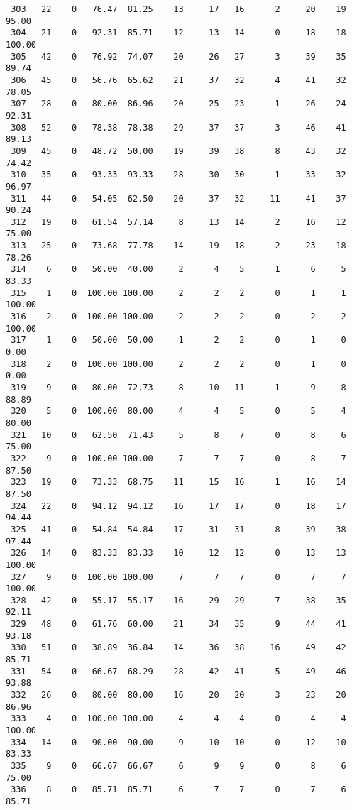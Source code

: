 \begin{verbatim}
 303   22    0   76.47  81.25    13     17   16      2     20    19    95.00
 304   21    0   92.31  85.71    12     13   14      0     18    18   100.00
 305   42    0   76.92  74.07    20     26   27      3     39    35    89.74
 306   45    0   56.76  65.62    21     37   32      4     41    32    78.05
 307   28    0   80.00  86.96    20     25   23      1     26    24    92.31
 308   52    0   78.38  78.38    29     37   37      3     46    41    89.13
 309   45    0   48.72  50.00    19     39   38      8     43    32    74.42
 310   35    0   93.33  93.33    28     30   30      1     33    32    96.97
 311   44    0   54.05  62.50    20     37   32     11     41    37    90.24
 312   19    0   61.54  57.14     8     13   14      2     16    12    75.00
 313   25    0   73.68  77.78    14     19   18      2     23    18    78.26
 314    6    0   50.00  40.00     2      4    5      1      6     5    83.33
 315    1    0  100.00 100.00     2      2    2      0      1     1   100.00
 316    2    0  100.00 100.00     2      2    2      0      2     2   100.00
 317    1    0   50.00  50.00     1      2    2      0      1     0     0.00
 318    2    0  100.00 100.00     2      2    2      0      1     0     0.00
 319    9    0   80.00  72.73     8     10   11      1      9     8    88.89
 320    5    0  100.00  80.00     4      4    5      0      5     4    80.00
 321   10    0   62.50  71.43     5      8    7      0      8     6    75.00
 322    9    0  100.00 100.00     7      7    7      0      8     7    87.50
 323   19    0   73.33  68.75    11     15   16      1     16    14    87.50
 324   22    0   94.12  94.12    16     17   17      0     18    17    94.44
 325   41    0   54.84  54.84    17     31   31      8     39    38    97.44
 326   14    0   83.33  83.33    10     12   12      0     13    13   100.00
 327    9    0  100.00 100.00     7      7    7      0      7     7   100.00
 328   42    0   55.17  55.17    16     29   29      7     38    35    92.11
 329   48    0   61.76  60.00    21     34   35      9     44    41    93.18
 330   51    0   38.89  36.84    14     36   38     16     49    42    85.71
 331   54    0   66.67  68.29    28     42   41      5     49    46    93.88
 332   26    0   80.00  80.00    16     20   20      3     23    20    86.96
 333    4    0  100.00 100.00     4      4    4      0      4     4   100.00
 334   14    0   90.00  90.00     9     10   10      0     12    10    83.33
 335    9    0   66.67  66.67     6      9    9      0      8     6    75.00
 336    8    0   85.71  85.71     6      7    7      0      7     6    85.71

\end{verbatim}

